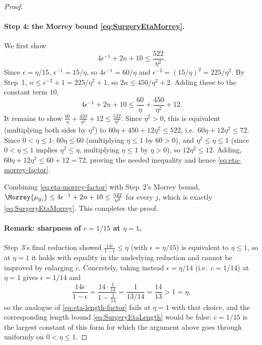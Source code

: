 \begin{proof}
  \paragraph{Step 4: the Morrey bound \eqref{eq:SurgeryEtaMorrey}.} We first show
  \begin{equation}
    \label{eq:eta-morrey-factor}
    4\epsilon^{-1}+2n+10 \le \frac{522}{\eta^2}
    .
  \end{equation}
  Since $\epsilon=\eta/15$, $\epsilon^{-1}=15/\eta$, so $4\epsilon^{-1}=60/\eta$ and
  $\epsilon^{-2}=(15/\eta)^2=225/\eta^2$. By Step~1, $n\le\epsilon^{-2}+1=225/\eta^2+1$, so
  $2n\le450/\eta^2+2$. Adding these to the constant term $10$,
  \[
    4\epsilon^{-1}+2n+10 \le \frac{60}{\eta}+\frac{450}{\eta^2}+12
    .
  \]
  It remains to show $\tfrac{60}{\eta}+\tfrac{450}{\eta^2}+12 \le \tfrac{522}{\eta^2}$. Since
  $\eta^2>0$, this is equivalent (multiplying both sides by $\eta^2$) to
  $60\eta+450+12\eta^2\le522$, i.e.\ $60\eta+12\eta^2\le72$. Since $0<\eta\le1$: $60\eta\le60$
  (multiplying $\eta\le1$ by $60>0$), and $\eta^2\le\eta\le1$ (since $0<\eta\le1$ implies
  $\eta^2\le\eta$, multiplying $\eta\le1$ by $\eta>0$), so $12\eta^2\le12$. Adding,
  $60\eta+12\eta^2\le60+12=72$, proving the needed inequality and hence
  \eqref{eq:eta-morrey-factor}.

  Combining \eqref{eq:eta-morrey-factor} with Step~2's Morrey bound,
  $\Morrey{\mu_{g_j}} \le 4\epsilon^{-1}+2n+10 \le \tfrac{522}{\eta^2}$ for every $j$, which is
  exactly \eqref{eq:SurgeryEtaMorrey}. This completes the proof.

  \paragraph{Remark: sharpness of $c=1/15$ at $\eta=1$.} Step~3's final reduction showed
  $\tfrac{14\epsilon}{1-\epsilon}\le\eta$ (with $\epsilon=\eta/15$) is equivalent to $\eta\le1$,
  so at $\eta=1$ it holds with equality in the underlying reduction and cannot be improved by
  enlarging $c$. Concretely, taking instead $\epsilon=\eta/14$ (i.e.\ $c=1/14$) at $\eta=1$ gives
  $\epsilon=1/14$ and
  \[
    \frac{14\epsilon}{1-\epsilon} = \frac{14\cdot\frac{1}{14}}{1-\frac{1}{14}} =
    \frac{1}{13/14} = \frac{14}{13} > 1 = \eta
    ,
  \]
  so the analogue of \eqref{eq:eta-length-factor} fails at $\eta=1$ with that choice, and the
  corresponding length bound \eqref{eq:SurgeryEtaLength} would be false: $c=1/15$ is the largest
  constant of this form for which the argument above goes through uniformly on $0<\eta\le1$.
\end{proof}
